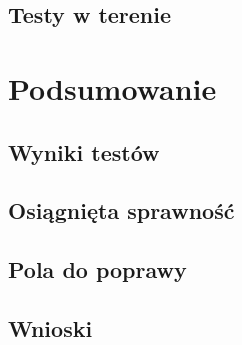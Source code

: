\section{Testy w terenie}

\chapter{Podsumowanie}

\section{Wyniki testów}
\section{Osiągnięta sprawność}
\section{Pola do poprawy}
\section{Wnioski}

